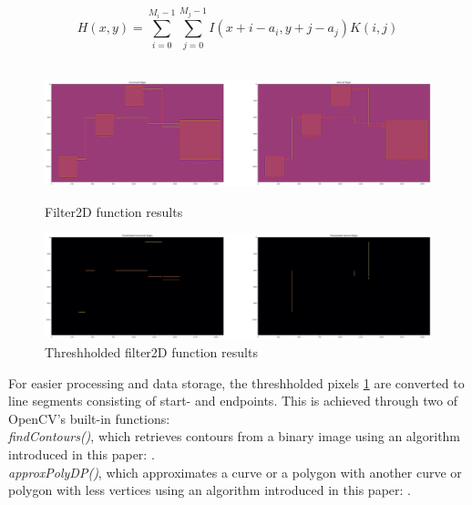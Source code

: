 \begin{equation}
\label{eq_filter2D}
    H(x, y) = \sum_{i=0}^{M_i-1} \sum_{j=0}^{M_j-1} I(x + i - a_i,y + j - a_j)K(i, j)
\end{equation}\\

\newpage

\begin{figure}[htb]
    \centering
    \includegraphics[width=1\linewidth]{Pictures/filter2D.png}
    \caption{Filter2D function results}
    \label{fig_filter2d}

    \centering
    \includegraphics[width=1\linewidth]{Pictures/threshhold.png}
    \caption{Threshholded filter2D function results}
    \label{fig_threshhold}
\end{figure}
For easier processing and data storage, the threshholded pixels \ref{fig_threshhold} are converted to line segments consisting of start- and endpoints. This is achieved through two of OpenCV's built-in functions:\\
\textit{findContours()}, which retrieves contours from a binary image using an algorithm introduced in this paper: \cite{art_findContours()_algorithm}.\\
\textit{approxPolyDP()}, which approximates a curve or a polygon with another curve or polygon with less vertices using an algorithm introduced in this paper: \cite{art_approx_Poly_DP()_algorithm}.
